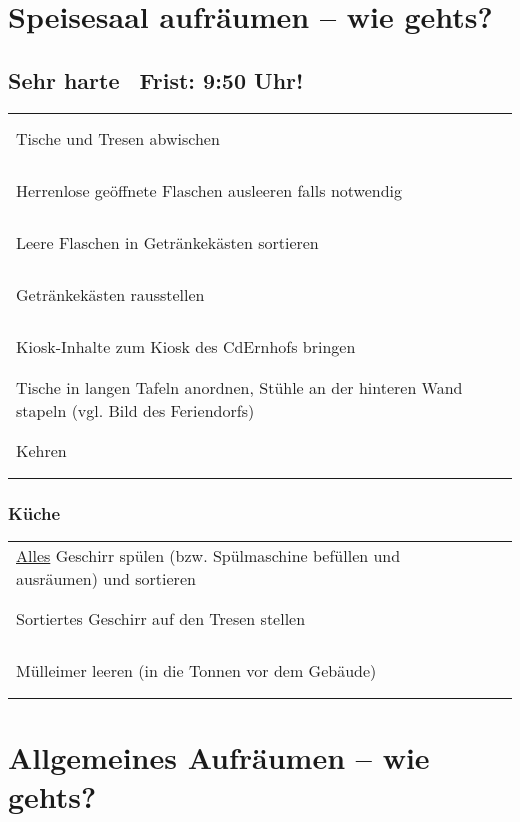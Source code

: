 \documentclass[14pt,parskip=full+]{scrartcl}
\newcommand{\checkfield}{~ \hfill ~\raisebox{-5pt}{\tikz\node[draw,minimum width=16.8pt,minimum height=16.8pt]{};}}
\newcommand{\mysection}[1]{\vspace{-.7\baselineskip}\subsubsection*{#1} \vspace{-.7\baselineskip}}
\begin{document}
\parbox[t]{.8\textwidth}{\vskip0pt
\section*{Speisesaal aufräumen -- wie gehts?}
\subsection*{Sehr harte\footnotemark~ Frist: 9:50 Uhr!}
}

\bigskip

\def\arraystretch{1.3}

\begin{tabularx}{\textwidth}{Xc}
 Tische und Tresen abwischen & \checkfield \\
 Herrenlose geöffnete Flaschen ausleeren falls notwendig & \checkfield \\
 Leere Flaschen in Getränkekästen sortieren & \checkfield \\
 Getränkekästen rausstellen & \checkfield \\
 Kiosk-Inhalte zum Kiosk des CdErnhofs bringen & \checkfield \\
 Tische in langen Tafeln anordnen, Stühle an der hinteren Wand stapeln (vgl. Bild des Feriendorfs)& \checkfield \\
 Kehren & \checkfield
\end{tabularx}
\mysection{Küche}
\begin{tabularx}{\textwidth}{Xc}
 \uline{Alles} Geschirr spülen (bzw. Spülmaschine befüllen und ausräumen) und sortieren & \checkfield \\ 
 Sortiertes Geschirr auf den Tresen stellen & \checkfield \\
 Mülleimer leeren (in die Tonnen vor dem Gebäude) & \checkfield \\
\end{tabularx}




\vspace{2cm}




\parbox[t]{.8\textwidth}{\vskip0pt
\section*{Allgemeines Aufräumen -- wie gehts?}
}
\parbox[t]{.2\textwidth}{\vskip0pt 
}
\end{document}

